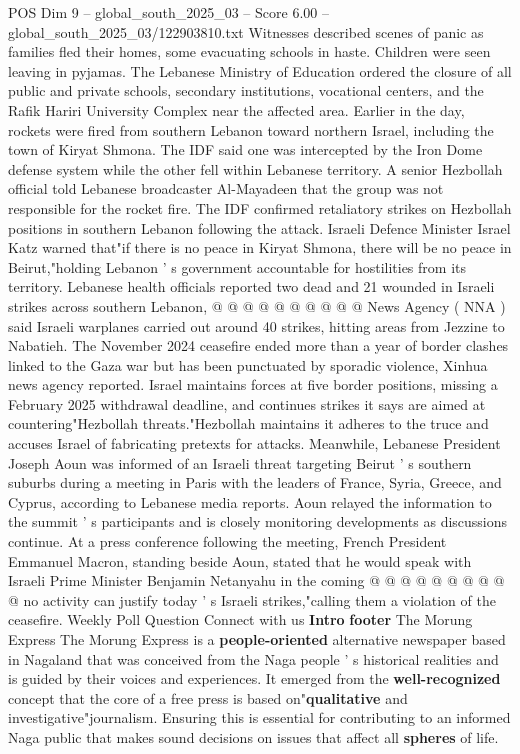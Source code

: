 \begin{textsample}{POS Dim 9 – global\_south\_2025\_03 – Score 6.00 – global\_south\_2025\_03/122903810.txt}  \label{ex:f9_pos_134}
Witnesses described scenes of panic as families fled their homes, some evacuating schools in haste.
Children were seen leaving in pyjamas.
The Lebanese Ministry of Education ordered the closure of all public and private schools, secondary institutions, vocational centers, and the Rafik Hariri University Complex near the affected area.
Earlier in the day, rockets were fired from southern Lebanon toward northern Israel, including the town of Kiryat Shmona.
The IDF said one was intercepted by the Iron Dome defense system while the other fell within Lebanese territory.
A senior Hezbollah official told Lebanese broadcaster Al-Mayadeen that the group was not responsible for the rocket fire.
The IDF confirmed retaliatory strikes on Hezbollah positions in southern Lebanon following the attack.
Israeli Defence Minister Israel Katz warned that"if there is no peace in Kiryat Shmona, there will be no peace in Beirut,"holding Lebanon ' s government accountable for hostilities from its territory.
Lebanese health officials reported two dead and 21 wounded in Israeli strikes across southern Lebanon, @ @ @ @ @ @ @ @ @ @ News Agency ( NNA ) said Israeli warplanes carried out around 40 strikes, hitting areas from Jezzine to Nabatieh.
The November 2024 ceasefire ended more than a year of border clashes linked to the Gaza war but has been punctuated by sporadic violence, Xinhua news agency reported.
Israel maintains forces at five border positions, missing a February 2025 withdrawal deadline, and continues strikes it says are aimed at countering"Hezbollah threats."Hezbollah maintains it adheres to the truce and accuses Israel of fabricating pretexts for attacks.
Meanwhile, Lebanese President Joseph Aoun was informed of an Israeli threat targeting Beirut ' s southern suburbs during a meeting in Paris with the leaders of France, Syria, Greece, and Cyprus, according to Lebanese media reports.
Aoun relayed the information to the summit ' s participants and is closely monitoring developments as discussions continue.
At a press conference following the meeting, French President Emmanuel Macron, standing beside Aoun, stated that he would speak with Israeli Prime Minister Benjamin Netanyahu in the coming @ @ @ @ @ @ @ @ @ @ no activity can justify today ' s Israeli strikes,"calling them a violation of the ceasefire.
Weekly Poll Question Connect with us \textbf{Intro} \textbf{footer} The Morung Express The Morung Express is a \textbf{people-oriented} alternative newspaper based in Nagaland that was conceived from the Naga people ' s historical realities and is guided by their voices and experiences.
It emerged from the \textbf{well-recognized} concept that the core of a free press is based on"\textbf{qualitative} and investigative"journalism.
Ensuring this is essential for contributing to an informed Naga public that makes sound decisions on issues that affect all \textbf{spheres} of life.

\end{textsample}
